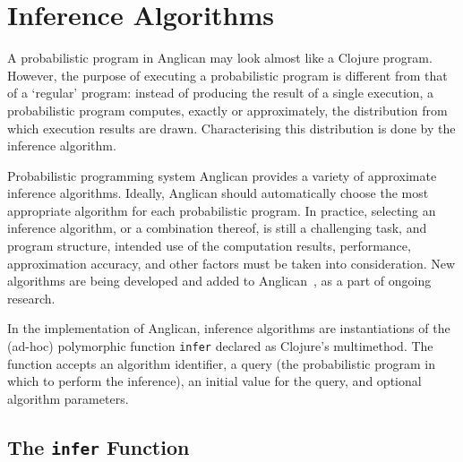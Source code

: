 \documentclass[preprint]{sigplanconf}
\begin{document}
\section{Inference Algorithms}
\label{sec:inference}

A probabilistic program in Anglican may look almost like a
Clojure program. However, the purpose of executing a
probabilistic program is different from that of a `regular'
program: instead of producing the result of a single execution,
a probabilistic program computes, exactly or approximately, the
distribution from which execution results are drawn.  Characterising
this distribution is done by the inference algorithm.

Probabilistic programming system Anglican provides a variety of
approximate inference algorithms. Ideally, Anglican should
automatically choose the most appropriate algorithm for each
probabilistic program. In practice, selecting an inference
algorithm, or a combination thereof, is still a challenging
task, and program structure, intended use of the computation
results, performance, approximation accuracy, and other factors
must be taken into consideration. New algorithms are being
developed and added to Anglican~\cite{TMP+15,MPT+16,RNL+2016},
as a part of ongoing research.

In the implementation of Anglican, inference algorithms are
instantiations of the (ad-hoc) polymorphic function
\texttt{infer} declared as Clojure's multimethod\iftoggle{full}{
in the \texttt{anglican.{\linebreak[0]}inference}
namespace}{}. The function accepts an algorithm identifier,
a query (the probabilistic program in which to perform the
inference), an initial value for the query, and optional
algorithm parameters.

\subsection{The \texttt{infer} Function}
\label{sec:infer}
\end{document}
